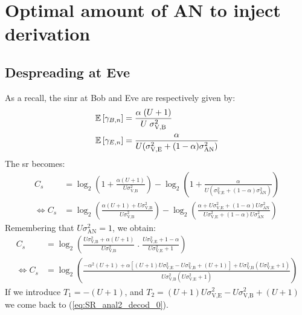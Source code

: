\renewcommand{\theparagraph}{B}

\section{Optimal amount of AN to inject derivation}
\subsection{Despreading at Eve}
\label{appB:alpha_decod0}
As a recall, the \gls{sinr} at Bob and Eve are respectively given by:
\begin{equation}
    \begin{split}
        \mathbb{E} \left[\gamma_{B,n}\right] &= \frac{\alpha \;(U+1)}{U \; \sigma_{\text{V,B}}^2} \\
        \mathbb{E} \left[\gamma_{E,n}\right] &= \frac{\alpha}{U(\sigma^2_{\text{V,E}}+(1-\alpha)\sigma^2_{\text{AN}})} 
    \end{split}
\end{equation}
The \gls{sr} becomes:
\begin{subequations}
\begin{align}
    C_s &= \log_2\left(1+ \frac{\alpha (U+1)}{U  \sigma_{\text{V,B}}^2}\right) - \log_2\left(1 + \frac{\alpha}{U(\sigma^2_{\text{V,E}}+(1-\alpha)\sigma^2_{\text{AN}})} \right)\\
    \Leftrightarrow C_s &= \log_2\left( \frac{\alpha (U+1) + U  \sigma_{\text{V,B}}^2}{U  \sigma_{\text{V,B}}^2} \right) - \log_2\left(  \frac{\alpha + U\sigma^2_{\text{V,E}}+(1-\alpha)U\sigma^2_{\text{AN}}}{U\sigma^2_{\text{V,E}}+(1-\alpha)U\sigma^2_{\text{AN}}}  \right)
 \end{align}
\end{subequations}
Remembering that $U\sigma^2_{\text{AN}} = 1$, we obtain:    
\begin{subequations}
\begin{align}
   C_s &= \log_2\left( \frac{U\sigma_{\text{V,B}}^2+\alpha(U+1)}{U\sigma_{\text{V,B}}^2} \; . \; \frac{U\sigma_{\text{V,E}}^2+1-\alpha}{U\sigma_{\text{V,E}}^2+1} \right) \\
   \Leftrightarrow C_s &= \log_2\left(  \frac{-\alpha^2(U+1) + \alpha \left[(U+1) U\sigma_{\text{V,E}}^2 - U\sigma_{\text{V,B}}^2  + (U+1)\right]+  U\sigma_{\text{V,B}}^2 (U\sigma_{\text{V,E}}^2+1)}{ U\sigma_{\text{V,B}}^2 (U\sigma_{\text{V,E}}^2+1)}\right)
\end{align}
\end{subequations}
If we introduce $T_1=-(U+1)$, and $T_2 = (U+1) U\sigma_{\text{V,E}}^2 - U\sigma_{\text{V,B}}^2 + (U+1)$ we come back to (\ref{eq:SR_anal2_decod_0}).




